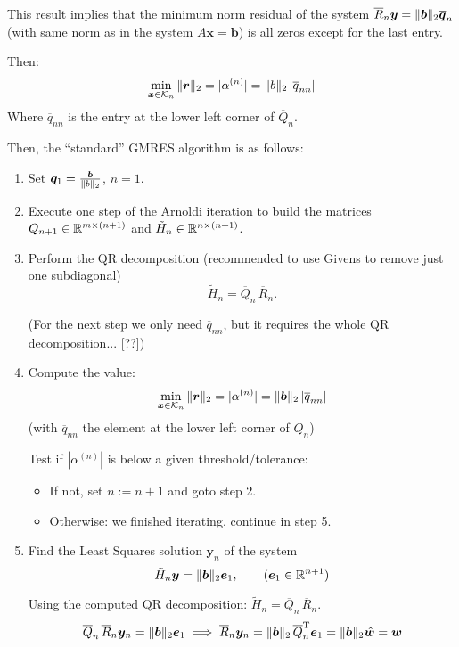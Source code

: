 \documentclass[
  12pt,
  paper=a4,
]{scrartcl} %
\begin{document}
This result implies that the minimum norm residual of the system
$\overline R_n \bm y = \|\bm b\|_2 \overline{\bm q}_n$
(with same norm as in the system $A\bm x = \bm b$) is all zeros except for the last entry.

Then:
\[
\min_{\bm x\in\mathcal{K}_n}\|
        \bm r
    \|_2
    = |\alpha^{(n)}| =
    \|b\|_2\, |\overline q_{nn}|
\]
Where $\overline q_{nn}$ is the entry at the lower left corner of $\overline{Q}_n$.

Then, the ``standard'' GMRES algorithm is as follows:
\begin{enumerate}
    \item Set $\bm q_1 = \frac{\bm b}{\|b\|_2}$, $n=1$.
    
    \item Execute one step of the Arnoldi iteration to build the matrices $Q_{n+1}\in \mathbb R^{m\times (n+1)}$ and $\tilde H_n \in \mathbb R^{n\times (n+1)}$.
    
    \item Perform the QR decomposition (recommended to use Givens to remove just one subdiagonal) \[\tilde{H}_n = \overline Q_n \, \overline R_n.\]
    
    (For the next step we only need $\overline{q}_{nn}$, but it requires the whole QR decomposition... [??])
    
    \item Compute the value:
    \[
        \min_{\bm x\in\mathcal{K}_n}\|
            \bm r
        \|_2
        = |\alpha^{(n)}| =
        \|\bm b\|_2\, |\overline { q}_{nn}|
    \]
    (with $\overline { q}_{nn}$ the element at the lower left corner of $\overline{Q}_n$)
    
    Test if $|\alpha^{(n)}|$ is below a given threshold/tolerance:
    
    \begin{itemize}
        \item If not, set $n:=n+1$ and goto step 2.
        \item Otherwise: we finished iterating, continue in step 5.
    \end{itemize}
    
    \item Find the Least Squares solution $\bm y_n$ of the system
    \[
        \tilde H_{n} \bm y = \|\bm b\|_2 \bm e_1,
        \qquad  (\bm e_1 \in \mathbb R^{n+1})
    \]
    
    Using the computed QR decomposition: $\tilde{H}_n = \overline Q_n \, \overline R_n$.
    \[
    \overline Q_n \, \overline R_n \bm y_n = \|\bm b\|_2 \bm e_1
    \implies 
    \overline R_n \bm y_n = \|\bm b\|_2\, \overline Q_n^{\mathrm{T}} \bm e_1 = \|\bm b\|_2\hat{\bm w} = \bm w
    \]
    

\end{enumerate}
\end{document}
